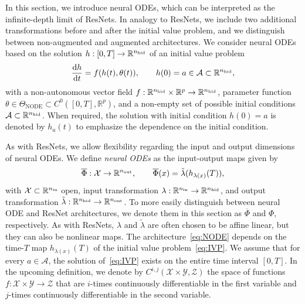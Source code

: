 \documentclass[10pt]{article}
\theoremstyle{definition}
\numberwithin{equation}{section}
\newcommand{\R}{\mathbb{R}}
\newcommand*{\dd}{\mathrm{d}}
\newcommand*{\nout}{n_\textup{out}}
\newcommand*{\nhid}{n_\textup{hid}}
\newcommand*{\nin}{n_\textup{in}}
\begin{document}
In this section, we introduce neural ODEs, which can be interpreted as the infinite-depth limit of ResNets. In analogy to ResNets, we include two additional transformations before and after the initial value problem, and we distinguish between non-augmented and augmented architectures.
We consider neural ODEs based on the solution $h:[0,T] \rightarrow \R^{\nhid}$ of an initial value problem 
\begin{equation} \label{eq:IVP} 
    \frac{\dd h}{\dd t} = f(h(t),\theta(t)), \qquad h(0) = a \in \mathcal{A} \subset \R^{\nhid}, 
\end{equation}
with a non-autonomous vector field $f : \R^{\nhid} \times \R^p \rightarrow \R^{\nhid}$, parameter function $\theta \in \Theta_{\text{NODE}} \subset C^0([0,T],\R^p)$, and a non-empty set of possible initial conditions $\mathcal{A} \subset \R^{\nhid}$. When required, the solution with initial condition $h(0) = a$ is denoted by $h_a(t)$ to emphasize the dependence on the initial condition. 

As with ResNets, we allow flexibility regarding the input and output dimensions of neural ODEs. We define \emph{neural ODEs} as the input-output maps given by
\begin{equation} \label{eq:NODE}
    \overline{\Phi}: \mathcal{X} \rightarrow \R^{\nout}, \qquad \overline{\Phi}(x) = \tilde{\lambda}(h_{\lambda(x)}(T)),
\end{equation} 
with $\mathcal{X}\subset \R^{\nin}$ open, input transformation $\lambda: \R^{\nin} \rightarrow \R^{\nhid}$, and output transformation $\tilde{\lambda}: \R^{\nhid}\rightarrow \R^{\nout}$. To more easily distinguish between neural ODE and ResNet architectures, we denote them in this section as $\overline{\Phi}$ and $\Phi$, respectively. As with ResNets, $\lambda$ and $\tilde{\lambda}$ are often chosen to be affine linear, but they can also be nonlinear maps. The architecture~\eqref{eq:NODE} depends on the time-$T$ map $h_{\lambda(x)}(T)$ of the initial value problem~\eqref{eq:IVP}. We assume that for every $a \in \mathcal{A}$, the solution of~\eqref{eq:IVP} exists on the entire time interval $[0,T]$. In the upcoming definition, we denote by $C^{i,j}(\mathcal{X}\times \mathcal{Y},\mathcal{Z})$ the space of functions $f: \mathcal{X}\times \mathcal{Y} \rightarrow \mathcal{Z}$ that are $i$-times continuously differentiable in the first variable and $j$-times continuously differentiable in the second variable.
\end{document}
